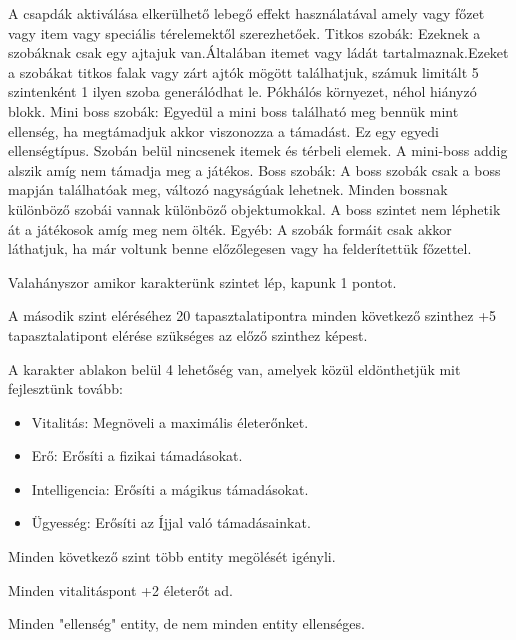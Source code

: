 A csapdák aktiválása elkerülhető lebegő effekt használatával amely vagy főzet vagy item vagy speciális térelemektől szerezhetőek.
\newline
Titkos szobák:
\newline
Ezeknek a szobáknak csak egy ajtajuk van.Általában itemet vagy ládát tartalmaznak.Ezeket a szobákat titkos falak vagy zárt ajtók mögött találhatjuk, számuk limitált 5 szintenként 1 ilyen szoba generálódhat le. Pókhálós környezet, néhol hiányzó blokk.
\newline
Mini boss szobák:
\newline
Egyedül a mini boss található meg bennük mint ellenség, ha megtámadjuk akkor viszonozza a támadást. Ez egy egyedi ellenségtípus. Szobán belül nincsenek itemek és térbeli elemek.
A mini-boss addig alszik amíg nem támadja meg a játékos.
\newline
Boss szobák:
\newline
A boss szobák csak a boss mapján találhatóak meg, változó nagyságúak lehetnek.
Minden bossnak különböző szobái vannak különböző objektumokkal.
A boss szintet nem léphetik át a játékosok amíg meg nem ölték.
\newline
Egyéb:
\newline
A szobák formáit csak akkor láthatjuk, ha már voltunk benne előzőlegesen vagy ha felderítettük főzettel.
\newpage
{}

Valahányszor amikor karakterünk szintet lép, kapunk 1 pontot.

A második szint eléréséhez 20 tapasztalatipontra minden következő szinthez +5 tapasztalatipont elérése szükséges az előző szinthez képest.

A karakter ablakon belül 4 lehetőség van, amelyek közül eldönthetjük mit fejlesztünk tovább:
\begin{itemize}
    \item Vitalitás: Megnöveli a maximális életerőnket.
    \item Erő: Erősíti a fizikai támadásokat.
    \item Intelligencia: Erősíti a mágikus támadásokat.
    \item Ügyesség: Erősíti az Íjjal való támadásainkat.
\end{itemize}

\noindent Minden következő szint több entity megölését igényli.

\noindent Minden vitalitáspont +2 életerőt ad.

\noindent Minden "ellenség" entity, de nem minden entity ellenséges.

